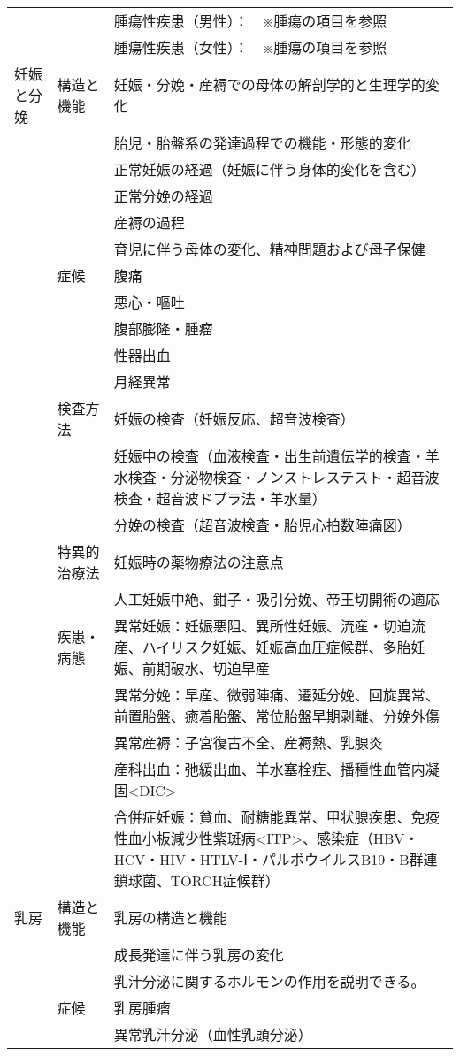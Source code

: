 \begin{xltabular}{\linewidth}{XXX}
 &  & 腫瘍性疾患（男性）：　※腫瘍の項目を参照 \\
 &  & 腫瘍性疾患（女性）：　※腫瘍の項目を参照 \\
妊娠と分娩 & 構造と機能 & 妊娠・分娩・産褥での母体の解剖学的と生理学的変化 \\
 &  & 胎児・胎盤系の発達過程での機能・形態的変化 \\
 &  & 正常妊娠の経過（妊娠に伴う身体的変化を含む） \\
 &  & 正常分娩の経過 \\
 &  & 産褥の過程 \\
 &  & 育児に伴う母体の変化、精神問題および母子保健 \\
 & 症候 & 腹痛 \\
 &  & 悪心・嘔吐 \\
 &  & 腹部膨隆・腫瘤 \\
 &  & 性器出血 \\
 &  & 月経異常 \\
 & 検査方法 & 妊娠の検査（妊娠反応、超音波検査） \\
 &  & 妊娠中の検査（血液検査・出生前遺伝学的検査・羊水検査・分泌物検査・ノンストレステスト・超音波検査・超音波ドプラ法・羊水量） \\
 &  & 分娩の検査（超音波検査・胎児心拍数陣痛図） \\
 & 特異的治療法 & 妊娠時の薬物療法の注意点 \\
 &  & 人工妊娠中絶、鉗子・吸引分娩、帝王切開術の適応 \\
 & 疾患・病態 & 異常妊娠：妊娠悪阻、異所性妊娠、流産・切迫流産、ハイリスク妊娠、妊娠高血圧症候群、多胎妊娠、前期破水、切迫早産 \\
 &  & 異常分娩：早産、微弱陣痛、遷延分娩、回旋異常、前置胎盤、癒着胎盤、常位胎盤早期剥離、分娩外傷 \\
 &  & 異常産褥：子宮復古不全、産褥熱、乳腺炎 \\
 &  & 産科出血：弛緩出血、羊水塞栓症、播種性血管内凝固<DIC> \\
 &  & 合併症妊娠：貧血、耐糖能異常、甲状腺疾患、免疫性血小板減少性紫斑病<ITP>、感染症（HBV・HCV・HIV・HTLV-Ⅰ・パルボウイルスB19・B群連鎖球菌、TORCH症候群） \\
乳房 & 構造と機能 & 乳房の構造と機能 \\
 &  & 成長発達に伴う乳房の変化 \\
 &  & 乳汁分泌に関するホルモンの作用を説明できる。 \\
 & 症候 & 乳房腫瘤 \\
 &  & 異常乳汁分泌（血性乳頭分泌） \\

\end{xltabular}
